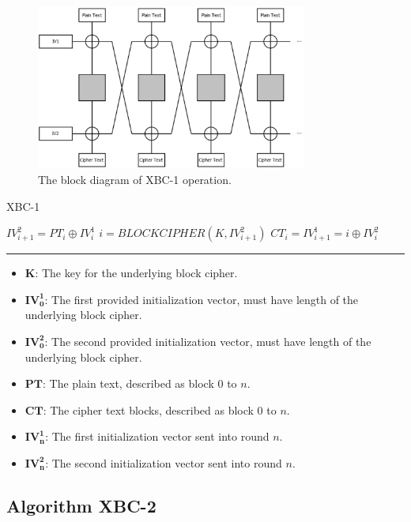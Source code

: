 \documentclass[conference]{IEEEtran}
\begin{document}
\begin{figure}[!t]
\centering
\includegraphics[width=3.5in]{xbc1.png}
\caption{The block diagram of XBC-1 operation.}
\label{fig_xbc1}
\end{figure}

\begin{algorithm}
 \caption{XBC-1}
 \label{alg-xbc1}
 \begin{algorithmic}
 \STATE $IV_{i+1}^2 = PT_i \oplus IV_{i}^1$
 \STATE $i = BLOCKCIPHER(K, IV_{i+1}^2)$
 \STATE $CT_i = IV_{i+1}^1 = i \oplus IV_{i}^2$
 \ENDFOR
 \end{algorithmic}

 \noindent\rule{3.5in}{0.4pt}

 \begin{itemize}
   \item {$\mathbf{K}$}: The key for the underlying block cipher.
   \item {$\mathbf{IV_0^1}$}: The first provided initialization vector, must have length of the underlying block cipher.
   \item {$\mathbf{IV_0^2}$}: The second provided initialization vector, must have length of the underlying block cipher.
   \item {$\mathbf{PT}$}: The plain text, described as block $0$ to $n$.
   \item {$\mathbf{CT}$}: The cipher text blocks, described as block $0$ to $n$.
   \item {$\mathbf{IV_n^1}$}: The first initialization vector sent into round $n$.
   \item {$\mathbf{IV_n^2}$}: The second initialization vector sent into round $n$.
 \end{itemize}
\end{algorithm}

\subsection{Algorithm XBC-2}
\end{document}
